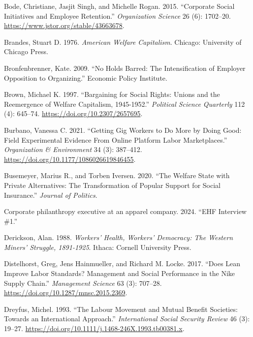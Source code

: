 \documentclass[
  11pt,
  oneside]{article}
\newlength{\cslhangindent}
\newenvironment{CSLReferences}[2] %
 {\begin{list}{}{%
  \setlength{\itemindent}{0pt}
  \setlength{\leftmargin}{0pt}
  \setlength{\parsep}{0pt}
  \ifodd #1
   \setlength{\leftmargin}{\cslhangindent}
   \setlength{\itemindent}{-1\cslhangindent}
  \fi
  \setlength{\itemsep}{#2\baselineskip}}}
 {\end{list}}
\begin{document}
\begin{CSLReferences}{1}{0}
Bode, Christiane, Jasjit Singh, and Michelle Rogan. 2015. {``Corporate {Social Initiatives} and {Employee Retention}.''} \emph{Organization Science} 26 (6): 1702--20. \url{https://www.jstor.org/stable/43663678}.

Brandes, Stuart D. 1976. \emph{American {Welfare Capitalism}}. Chicago: University of Chicago Press.

Bronfenbrenner, Kate. 2009. {``No Holds Barred: The Intensification of Employer Opposition to Organizing.''} Economic Policy Institute.

Brown, Michael K. 1997. {``Bargaining for {Social Rights}: {Unions} and the {Reemergence} of {Welfare Capitalism}, 1945-1952.''} \emph{Political Science Quarterly} 112 (4): 645--74. \url{https://doi.org/10.2307/2657695}.

Burbano, Vanessa C. 2021. {``Getting {Gig Workers} to {Do More} by {Doing Good}: {Field Experimental Evidence From Online Platform Labor Marketplaces}.''} \emph{Organization \& Environment} 34 (3): 387--412. \url{https://doi.org/10.1177/1086026619846455}.

Busemeyer, Marius R., and Torben Iversen. 2020. {``The {Welfare} {State} with {Private} {Alternatives}: The Transformation of Popular Support for Social Insurance.''} \emph{Journal of Politics}.

Corporate philanthropy executive at an apparel company. 2024. {``{EHF} Interview \#1.''}

Derickson, Alan. 1988. \emph{Workers' {Health}, {Workers}' {Democracy}: {The} {Western} {Miners}' {Struggle}, 1891-1925}. Ithaca: Cornell University Press.

Distelhorst, Greg, Jens Hainmueller, and Richard M. Locke. 2017. {``Does {Lean} {Improve} {Labor} {Standards}? {Management} and {Social} {Performance} in the {Nike} {Supply} {Chain}.''} \emph{Management Science} 63 (3): 707--28. \url{https://doi.org/10.1287/mnsc.2015.2369}.

Dreyfus, Michel. 1993. {``The Labour Movement and Mutual Benefit Societies: {Towards} an International Approach.''} \emph{International Social Security Review} 46 (3): 19--27. \url{https://doi.org/10.1111/j.1468-246X.1993.tb00381.x}.


\end{CSLReferences}
\end{document}
